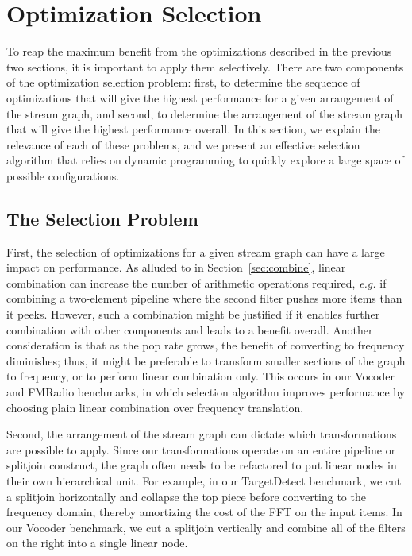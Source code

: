 
\section{Optimization Selection}
\label{sec:partitioning}

To reap the maximum benefit from the optimizations described in the
previous two sections, it is important to apply them selectively.
There are two components of the optimization selection problem: first,
to determine the sequence of optimizations that will give the highest
performance for a given arrangement of the stream graph, and second,
to determine the arrangement of the stream graph that will give the
highest performance overall.  In this section, we explain the
relevance of each of these problems, and we present an effective
selection algorithm that relies on dynamic programming to quickly
explore a large space of possible configurations.

\subsection{The Selection Problem}

First, the selection of optimizations for a given stream graph can
have a large impact on performance.  As alluded to in
Section~\ref{sec:combine}, linear combination can increase the number
of arithmetic operations required, {\it e.g.} if combining a
two-element pipeline where the second filter pushes more items than it
peeks.  However, such a combination might be justified if it enables
further combination with other components and leads to a benefit
overall.  Another consideration is that as the pop rate grows, the
benefit of converting to frequency diminishes; thus, it might be
preferable to transform smaller sections of the graph to frequency, or
to perform linear combination only.  This occurs in our Vocoder and
FMRadio benchmarks, in which selection algorithm improves performance
by choosing plain linear combination over frequency translation.

Second, the arrangement of the stream graph can dictate which
transformations are possible to apply.  Since our transformations
operate on an entire pipeline or splitjoin construct, the graph often
needs to be refactored to put linear nodes in their own hierarchical
unit.  For example, in our TargetDetect benchmark, we cut a splitjoin
horizontally and collapse the top piece before converting to the
frequency domain, thereby amortizing the cost of the FFT on the input
items.
In our Vocoder benchmark, we cut a splitjoin vertically and combine
all of the filters on the right into a single linear node.

